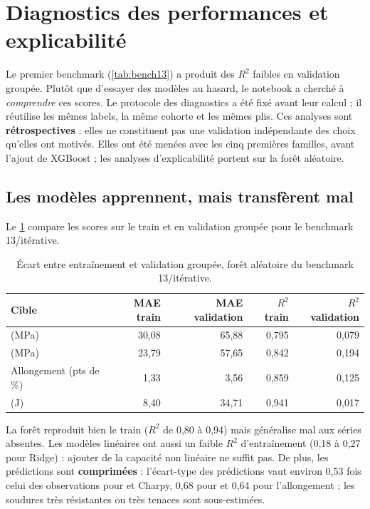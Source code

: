 \clearpage
\section{Diagnostics des performances et explicabilité}
\label{sec:diag}

Le premier benchmark (\cref{tab:bench13}) a produit des $R^2$ faibles en
validation groupée. Plutôt que d'essayer des modèles au hasard, le notebook
 a cherché à \emph{comprendre} ces scores. Le
protocole des diagnostics a été fixé avant leur calcul ; il réutilise les mêmes
labels, la même cohorte et les mêmes plis. Ces analyses sont \textbf{rétrospectives} :
elles ne constituent pas une validation indépendante des choix qu'elles ont motivés.
Elles ont été menées avec les cinq premières familles, avant l'ajout de XGBoost ;
les analyses d'explicabilité portent sur la forêt aléatoire.

\subsection{Les modèles apprennent, mais transfèrent mal}

Le \cref{tab:ecart_train} compare les scores sur le train et en validation
groupée pour le benchmark 13/itérative.

\begin{table}[htbp]
\centering
\small
\caption{Écart entre entraînement et validation groupée, forêt aléatoire du benchmark 13/itérative.}
\label{tab:ecart_train}
\begin{tabular}{@{}lrrrr@{}}
\toprule
Cible & MAE train & MAE validation & $R^2$ train & $R^2$ validation \\
\midrule
\YS{} (MPa)             & 30,08 & 65,88 & 0,795 & 0,079 \\
\UTS{} (MPa)            & 23,79 & 57,65 & 0,842 & 0,194 \\
Allongement (pts de \%) & 1,33  & 3,56  & 0,859 & 0,125 \\
\charpy{} (J)           & 8,40  & 34,71 & 0,941 & 0,017 \\
\bottomrule
\end{tabular}
\end{table}

La forêt reproduit bien le train ($R^2$ de 0,80 à 0,94) mais généralise mal aux
séries absentes. Les modèles linéaires ont aussi un faible $R^2$ d'entraînement
(0,18 à 0,27 pour Ridge) : ajouter de la capacité non linéaire ne suffit pas.
De plus, les prédictions sont \textbf{comprimées} : l'écart-type des prédictions
vaut environ 0,53 fois celui des observations pour \YS{} et Charpy, 0,68 pour
\UTS{} et 0,64 pour l'allongement ; les soudures très résistantes ou très
tenaces sont sous-estimées.

